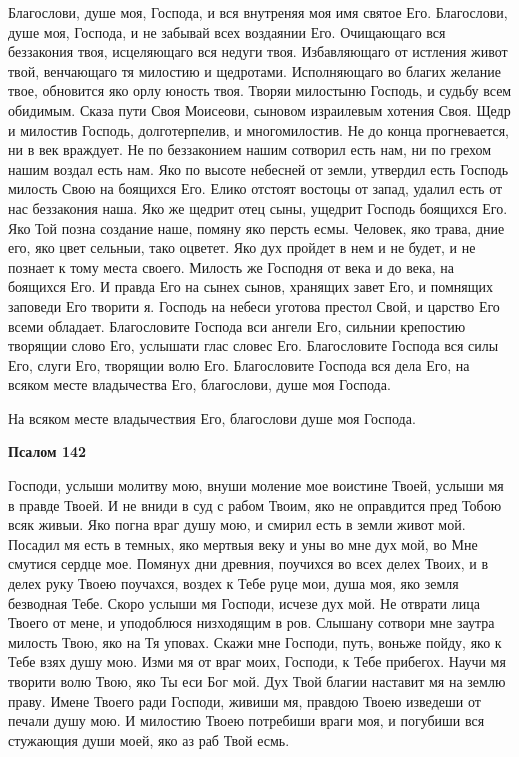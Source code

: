 Благослови, душе моя, Господа, и вся внутреняя моя имя святое Его. Благослови, душе моя, Господа, и не забывай всех воздаянии Его. Очищающаго вся беззакония твоя, исцеляющаго вся недуги твоя. Избавляющаго от истления живот твой, венчающаго тя милостию и щедротами. Исполняющаго во благих желание твое, обновится яко орлу юность твоя. Творяи милостыню Господь, и судьбу всем обидимым. Сказа пути Своя Моисеови, сыновом израилевым хотения Своя. Щедр и милостив Господь, долготерпелив, и многомилостив. Не до конца прогневается, ни в век враждует. Не по беззаконием нашим сотворил есть нам, ни по грехом нашим воздал есть нам. Яко по высоте небесней от земли, утвердил есть Господь милость Свою на боящихся Его. Елико отстоят востоцы от запад, удалил есть от нас беззакония наша. Яко же щедрит отец сыны, ущедрит Господь боящихся Его. Яко Той позна создание наше, помяну яко персть есмы. Человек, яко трава, дние его, яко цвет сельныи, тако оцветет. Яко дух пройдет в нем и не будет, и не познает к тому места своего. Милость же Господня от века и до века, на боящихся Его. И правда Его на сынех сынов, хранящих завет Его, и помнящих заповеди Его творити я. Господь на небеси уготова престол Свой, и царство Его всеми обладает. Благословите Господа вси ангели Его, сильнии крепостию творящии слово Его, услышати глас словес Его. Благословите Господа вся силы Его, слуги Его, творящии волю Его. Благословите Господа вся дела Его, на всяком месте владычества Его, благослови, душе моя Господа.


На всяком месте владычествия Его, благослови душе моя Господа.





\bfseries Псалом 142\normalfont{}


Господи, услыши молитву мою, внуши моление мое воистине Твоей, услыши мя в правде Твоей. И не вниди в суд с рабом Твоим, яко не оправдится пред Тобою всяк живыи. Яко погна враг душу мою, и смирил есть в земли живот мой. Посадил мя есть в темных, яко мертвыя веку и уны во мне дух мой, во Мне смутися сердце мое. Помянух дни древния, поучихся во всех делех Твоих, и в делех руку Твоею поучахся, воздех к Тебе руце мои, душа моя, яко земля безводная Тебе. Скоро услыши мя Господи, исчезе дух мой. Не отврати лица Твоего от мене, и уподоблюся низходящим в ров. Слышану сотвори мне заутра милость Твою, яко на Тя уповах. Скажи мне Господи, путь, воньже пойду, яко к Тебе взях душу мою. Изми мя от враг моих, Господи, к Тебе прибегох. Научи мя творити волю Твою, яко Ты еси Бог мой. Дух Твой благии наставит мя на землю праву. Имене Твоего ради Господи, живиши мя, правдою Твоею изведеши от печали душу мою. И милостию Твоею потребиши враги моя, и погубиши вся стужающия души моей, яко аз раб Твой есмь.


